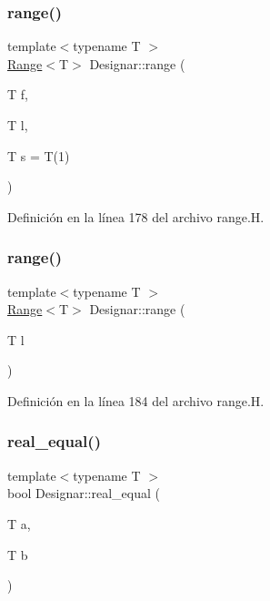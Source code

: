 \subsubsection{\texorpdfstring{range()}{range()}\hspace{0.1cm}{\footnotesize\ttfamily [1/2]}}
{\footnotesize\ttfamily template$<$typename T $>$ \\
\hyperlink{class_designar_1_1_range}{Range}$<$T$>$ Designar\+::range (\begin{DoxyParamCaption}\item[{T}]{f,  }\item[{T}]{l,  }\item[{T}]{s = {\ttfamily T(1)} }\end{DoxyParamCaption})}



Definición en la línea 178 del archivo range.\+H.

\mbox{\label{namespace_designar_a98dd2d05fccceaa32cdbf3f34c7dc120}} 
\subsubsection{\texorpdfstring{range()}{range()}\hspace{0.1cm}{\footnotesize\ttfamily [2/2]}}
{\footnotesize\ttfamily template$<$typename T $>$ \\
\hyperlink{class_designar_1_1_range}{Range}$<$T$>$ Designar\+::range (\begin{DoxyParamCaption}\item[{T}]{l }\end{DoxyParamCaption})}



Definición en la línea 184 del archivo range.\+H.

\mbox{\label{namespace_designar_aa3e1023369fdb239670900996db45d05}} 
\subsubsection{\texorpdfstring{real\+\_\+equal()}{real\_equal()}}
{\footnotesize\ttfamily template$<$typename T $>$ \\
bool Designar\+::real\+\_\+equal (\begin{DoxyParamCaption}\item[{T}]{a,  }\item[{T}]{b }\end{DoxyParamCaption})}



